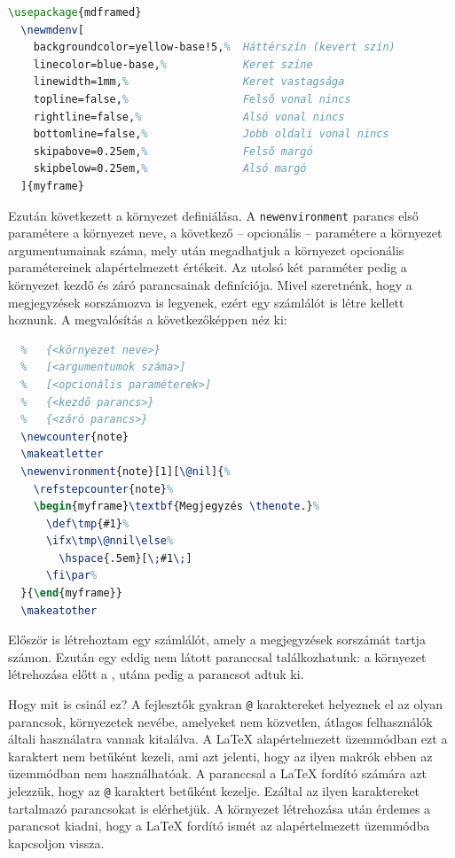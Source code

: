 \begin{lstlisting}[language=tex,caption={Saját megjegyzés környezet}]
  \usepackage{mdframed}
  \newmdenv[
    backgroundcolor=yellow-base!5,%  Háttérszín (kevert szín)
    linecolor=blue-base,%            Keret színe
    linewidth=1mm,%                  Keret vastagsága
    topline=false,%                  Felső vonal nincs
    rightline=false,%                Alsó vonal nincs
    bottomline=false,%               Jobb oldali vonal nincs
    skipabove=0.25em,%               Felső margó
    skipbelow=0.25em,%               Alsó margó
  ]{myframe}
\end{lstlisting}

Ezután következett a környezet definiálása. A \texttt{newenvironment} parancs
első paramétere a környezet neve, a következő -- opcionális -- paramétere a
környezet argumentumainak száma, mely után megadhatjuk a környezet opcionális
paramétereinek alapértelmezett értékeit. Az utolsó két paraméter pedig a
környezet kezdő és záró parancsainak definíciója. Mivel szeretnénk, hogy a
megjegyzések sorszámozva is legyenek, ezért egy számlálót is létre kellett
hoznunk. A megvalósítás a következőképpen néz ki:

\begin{lstlisting}[language=tex,caption={Megjegyzés környezet}]
  % \newenvironment
  %   {<környezet neve>}
  %   [<argumentumok száma>]
  %   [<opcionális paraméterek>]
  %   {<kezdő parancs>}
  %   {<záró parancs>}
  \newcounter{note}
  \makeatletter
  \newenvironment{note}[1][\@nil]{%
    \refstepcounter{note}%
    \begin{myframe}\textbf{Megjegyzés \thenote.}%
      \def\tmp{#1}%
      \ifx\tmp\@nnil\else%
        \hspace{.5em}[\;#1\;]
      \fi\par%
  }{\end{myframe}}
  \makeatother
\end{lstlisting}

Először is létrehoztam egy számlálót, amely a megjegyzések sorszámát tartja
számon. Ezután egy eddig nem látott paranccsal találkozhatunk: a környezet
létrehozása előtt a
,
utána pedig a
parancsot adtuk ki.

Hogy mit is csinál ez? A fejlesztők gyakran \texttt{@}
karaktereket helyeznek el az olyan parancsok, környezetek nevébe, amelyeket nem
közvetlen, átlagos felhasználók általi használatra vannak kitalálva. A \LaTeX{}
alapértelmezett üzemmódban ezt a karaktert nem betűként kezeli, ami azt jelenti,
hogy az ilyen makrók ebben az üzemmódban nem használhatóak. A
paranccsal a \LaTeX{} fordító számára azt jelezzük, hogy az \texttt{@} karaktert
betűként kezelje. Ezáltal az ilyen karaktereket tartalmazó parancsokat is
elérhetjük. A környezet létrehozása után érdemes a
parancsot kiadni, hogy a \LaTeX{} fordító ismét az alapértelmezett üzemmódba
kapcsoljon vissza.

